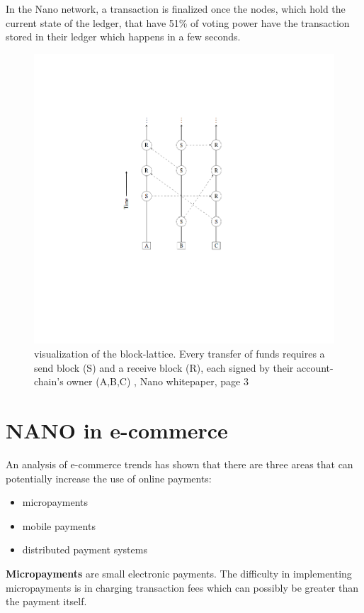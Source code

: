 \documentclass{ferseminar}
\begin{document}
In the Nano network, a transaction is finalized once the nodes, which hold the current state of the ledger, that have 51\% of voting power have the transaction stored in their ledger which happens in a few seconds.

\begin{figure}[ht]
	\caption{visualization of the block-lattice. 
		Every transfer of funds requires a
		send block (S) and a receive block (R), each signed by their account-chain’s
		owner (A,B,C) \cite{Nano}, Nano whitepaper, page 3}
	\includegraphics[scale=0.55]{lattice}
	\centering
\end{figure}
\FloatBarrier

\section{NANO in e-commerce}
An analysis of e-commerce trends \cite{Lowry} has shown that there are three areas that can potentially increase the use of online payments:
\begin{itemize}
	\item micropayments
	\item mobile payments
	\item distributed payment systems
\end{itemize}

\textbf{Micropayments} are small electronic payments. The difficulty in implementing micropayments is in charging transaction fees which can possibly be greater than the payment itself.
\end{document}
